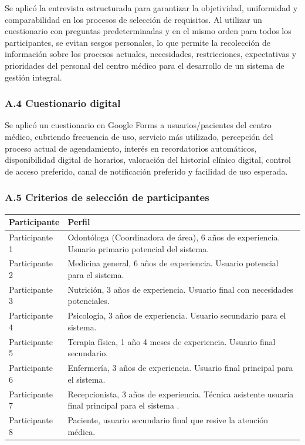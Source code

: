 \documentclass[11pt,a4paper]{article}
\begin{document}
	Se aplicó la entrevista estructurada para garantizar la objetividad, uniformidad y comparabilidad en los procesos de selección de requisitos. Al utilizar un cuestionario con preguntas predeterminadas y en el mismo orden para todos los participantes, se evitan sesgos personales, lo que permite la recolección de información sobre los procesos actuales, necesidades, restricciones, expectativas y prioridades del personal del centro médico para el desarrollo de un sistema de gestión integral.
	
	\subsubsection{A.4 Cuestionario digital}
	
	Se aplicó un cuestionario en Google Forms a usuarios/pacientes del centro médico, cubriendo frecuencia de uso, servicio más utilizado, percepción del proceso actual de agendamiento, interés en recordatorios automáticos, disponibilidad digital de horarios, valoración del historial clínico digital, control de acceso preferido, canal de notificación preferido y facilidad de uso esperada.
	
	\subsubsection{A.5 Criterios de selección de participantes}
	
	\begin{longtable}{p{} p{} }
		
		
		\toprule
		\textbf{Participante} &
		\textbf{Perfil}  \\
		\midrule
		\endhead
		Participante 1 & Odontóloga (Coordinadora de área), 6 años de experiencia. Usuario primario potencial del sistema. \\
		Participante 2 & Medicina general, 6 años de experiencia. Usuario potencial para el sistema. \\
		Participante 3 & Nutrición, 3 años de experiencia. Usuario final con necesidades potenciales. \\
		Participante 4 & Psicología, 3 años de experiencia. Usuario secundario para el sistema. \\
		Participante 5 & Terapia física, 1 año 4 meses de experiencia. Usuario final secundario. \\
		Participante 6 & Enfermería, 3 años de experiencia. Usuario final principal para el sistema. \\
		Participante 7 & Recepcionista, 3 años de experiencia. Técnica asistente usuaria final principal para el sistema . \\
		Participante 8 & Paciente, usuario secundario final que resive la atención médica. \\
		
		\bottomrule
	\end{longtable}
	
\end{document}
